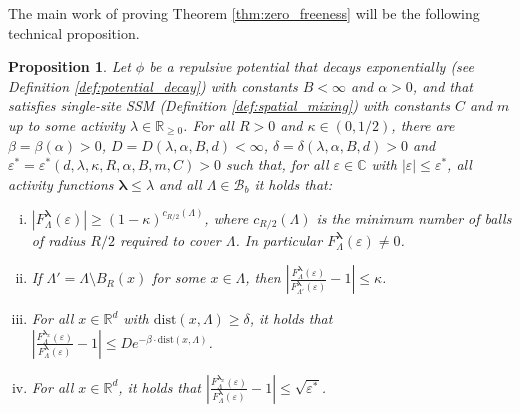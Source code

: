 \documentclass[10pt]{amsart}
\newtheorem{proposition}[theorem]{Proposition}
\theoremstyle{definition}
\theoremstyle{remark}
\newcommand{\dist}{\mathrm{dist}}
\newcommand{\R}{\mathbb{R}}
\newcommand{\C}{\mathbb{C}}
\newcommand{\region}{\Lambda}
\newcommand{\potential}{\phi}
\newcommand{\activity}{\lambda}
\newcommand{\activities}{\pmb{\lambda}}
\newcommand{\borel}{\mathcal{B}}
\newcommand{\absolute}[1]{\left\lvert#1\right\rvert}
\newcommand{\epsbound}{\varepsilon^{*}}
\begin{document}
	
	The main work of proving Theorem \ref{thm:zero_freeness} will be the following technical proposition.
	\begin{proposition}\label{prop:expectations}
		Let $\potential$ be a repulsive potential that decays exponentially (see Definition \ref{def:potential_decay}) with constants $B < \infty$ and $\alpha > 0$, and that satisfies single-site SSM (Definition \ref{def:spatial_mixing}) with constants $C$ and $m$ up to some activity $\activity \in \R_{\ge 0}$.
		For all $R > 0$ and $\kappa \in (0, 1/2)$, there are $\beta = \beta(\alpha) > 0$, $D = D(\activity, \alpha, B,d) < \infty$, $\delta = \delta(\activity, \alpha, B, d) > 0$ and $\epsbound = \epsbound(d, \activity, \kappa, R, \alpha, B, m, C) > 0$ such that, for all $\varepsilon \in \C$ with $\absolute{\varepsilon} \le \epsbound$, all activity functions $\activities \le \activity$ and all $\region \in \borel_{b}$ it holds that:
		\begin{enumerate}[(i)]
			\item\label{prop:expectations:zerofree}  $\absolute{F_{\region}^{\activities}(\varepsilon)} \ge (1-\kappa)^{c_{R/2}(\region)}$, where $c_{R/2}(\region)$ is the minimum number of balls of radius $R/2$ required to cover $\region$.
			In particular $F_{\region}^{\activities}(\varepsilon) \neq 0$. 
			
			\item\label{prop:expectations:region} If $\region' = \region \setminus B_{R}(x)$ for some $x \in \region$, then $\displaystyle \absolute{\frac{F_{\region}^{\activities}(\varepsilon)}{F_{\region'}^{\activities}(\varepsilon)} - 1} \le \kappa$.
			\item\label{prop:expectations:decay} For all $x \in \R^d$ with $\dist(x, \region) \ge \delta$, it holds that
			$\displaystyle \absolute{\frac{F_{\region}^{\activities_x}(\varepsilon)}{F_{\region}^{\activities}(\varepsilon)} - 1} \le D  e^{-\beta\cdot\dist(x, \region)}$.
			\item\label{prop:expectations:boundary} For all $x \in \R^d$, it holds that
			$\displaystyle \absolute{\frac{F_{\region}^{\activities_x}(\varepsilon)}{F_{\region}^{\activities}(\varepsilon)} - 1} \le \sqrt{\epsbound}$.
		\end{enumerate}
	\end{proposition}
	
\end{document}
